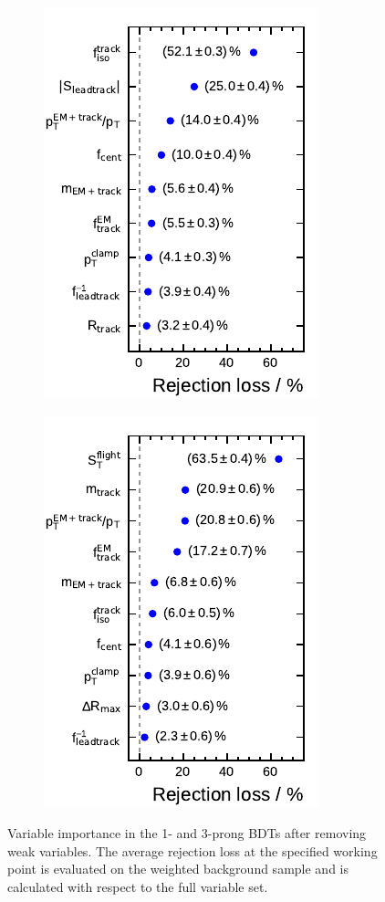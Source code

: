 \begin{figure}[htb]
  \centering
  \begin{subfigure}[t]{0.48\textwidth}
    \centering
    \includegraphics{./figures/bdt_perf/var_importance/1p_iter2.pdf}
  \end{subfigure}\hfill
  \begin{subfigure}[t]{0.48\textwidth}
    \centering
    \includegraphics{./figures/bdt_perf/var_importance/3p_iter3.pdf}
  \end{subfigure}
  \caption[Variable importance ranking for the 1- and 3-prong BDT after removing
  weak variables]{Variable importance in the 1- and 3-prong BDTs after removing
    weak variables. The average rejection loss at the specified working point is
    evaluated on the weighted background sample and is calculated with respect
    to the full variable set.}
  \label{fig:variable_importance_final}
\end{figure}

